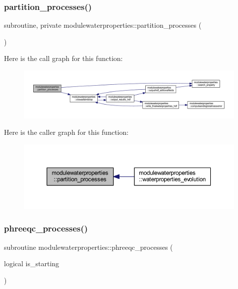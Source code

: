 \subsubsection{\texorpdfstring{partition\+\_\+processes()}{partition\_processes()}}
{\footnotesize\ttfamily subroutine, private modulewaterproperties\+::partition\+\_\+processes (\begin{DoxyParamCaption}{ }\end{DoxyParamCaption})\hspace{0.3cm}{\ttfamily [private]}}

Here is the call graph for this function\+:\nopagebreak
\begin{figure}[H]
\begin{center}
\leavevmode
\includegraphics[width=350pt]{namespacemodulewaterproperties_a24b8d7aa76331b7a72150e027594beba_cgraph}
\end{center}
\end{figure}
Here is the caller graph for this function\+:\nopagebreak
\begin{figure}[H]
\begin{center}
\leavevmode
\includegraphics[width=350pt]{namespacemodulewaterproperties_a24b8d7aa76331b7a72150e027594beba_icgraph}
\end{center}
\end{figure}
\mbox{\label{namespacemodulewaterproperties_a24e8f85633a4f1ac903cfa366e4669d7}} 
\subsubsection{\texorpdfstring{phreeqc\+\_\+processes()}{phreeqc\_processes()}}
{\footnotesize\ttfamily subroutine modulewaterproperties\+::phreeqc\+\_\+processes (\begin{DoxyParamCaption}\item[{logical}]{is\+\_\+starting }\end{DoxyParamCaption})\hspace{0.3cm}{\ttfamily [private]}}

